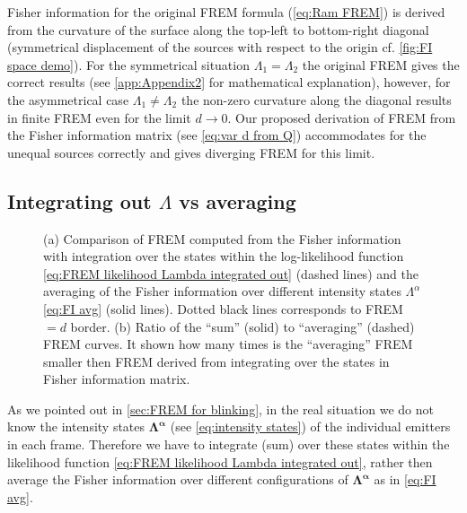 Fisher information for the original FREM formula (\autoref{eq:Ram FREM}) is derived from the curvature of the surface along the top-left to bottom-right diagonal (symmetrical displacement of the sources with respect to the origin cf. \autoref{fig:FI space demo}). For the symmetrical situation $\Lambda_1=\Lambda_2$ the original FREM gives the correct results (see \autoref{app:Appendix2} for mathematical explanation), however, for the asymmetrical case $\Lambda_1\neq\Lambda_2$ the non-zero curvature along the diagonal results in finite FREM even for the limit $d\rightarrow 0$. Our proposed derivation of FREM from the Fisher information matrix (see \autoref{eq:var d from Q}) accommodates for the unequal sources correctly and gives diverging FREM for this limit. 

\subsection{Integrating out $\Lambda$ vs averaging\label{sub:Int out vs avg}}
\begin{figure}[!hbt]
	\centering
	\newcommand{\wf}{.49\textwidth}
	\caption{(a) Comparison of FREM computed from the Fisher information with integration over the states within the log-likelihood function \autoref{eq:FREM likelihood Lambda integrated out} (dashed lines) and the averaging of the Fisher information over different intensity states $\Lambda^{\alpha}$ \autoref{eq:FI avg} (solid lines). Dotted black lines corresponds to FREM$=d$ border. (b) Ratio of the ``sum'' (solid) to ``averaging'' (dashed) FREM curves. It shown how many times is the ``averaging'' FREM smaller then FREM derived from integrating over the states in Fisher information matrix.}
	\label{fig:FREM int out vs avg}
\end{figure}
% 
As we pointed out in \autoref{sec:FREM for blinking}, in the real situation we do not know the intensity states $\bm{\Lambda^{\alpha}}$ (see \autoref{eq:intensity states}) of the individual emitters in each frame. Therefore  we have to integrate (sum) over these states within the likelihood function \autoref{eq:FREM likelihood Lambda integrated out}, rather then average the Fisher information over different configurations of $\bm{\Lambda^{\alpha}}$ as in \autoref{eq:FI avg}. 

